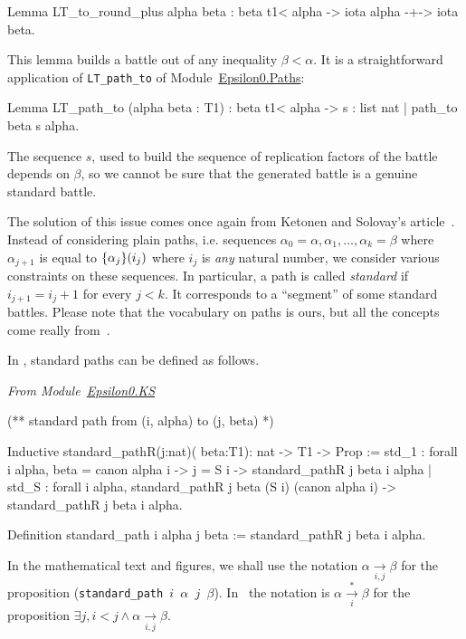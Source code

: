 \begin{Coqsrc}
Lemma LT_to_round_plus alpha beta :
    beta t1< alpha ->  iota alpha -+-> iota beta.
\end{Coqsrc}

This lemma builds a battle out of any inequality $\beta<\alpha$. 
It is a straightforward application of \texttt{LT\_path\_to} of
Module~\href{../theories/html/hydras.Epsilon0.Paths.html}{Epsilon0.Paths}:

\begin{Coqsrc}
Lemma LT_path_to (alpha beta : T1) :
  beta t1< alpha -> {s : list nat | path_to beta s alpha}.
\end{Coqsrc}

The sequence $s$, used to build the sequence of replication factors of the battle depends on 
$\beta$, so we cannot be sure that the generated battle is a genuine standard battle.


The solution of this issue comes  once again from Ketonen and Solovay's article~\cite{KS81}. Instead of considering plain paths, i.e. sequences 
$\alpha_0=\alpha,\alpha_1,\dots,\alpha_k=\beta$ where $\alpha_{j+1}$ is equal
to $\mbox{$\{\alpha_j\}(i_j)$}$ where $i_j$ is \emph{any} natural number, 
we consider various constraints on these sequences.
In particular, a path is called \emph{standard} if $i_{j+1} = i_j + 1$ for every $j<k$.
It  corresponds to a ``segment'' of some standard battles. 
Please note that the vocabulary on paths is ours, but all the concepts come really from~\cite{KS81}.

In \coq{}, standard paths can be defined as follows.

\vspace{4pt}
\emph{From Module~\href{../theories/html/hydras.Epsilon0.KS.html}{Epsilon0.KS}}

\begin{Coqsrc}
(**  standard path from (i, alpha) to (j, beta) *)

Inductive standard_pathR(j:nat)( beta:T1):  nat -> T1 -> Prop :=
  std_1 : forall i alpha, 
       beta = canon alpha i -> j = S i ->
       standard_pathR j beta i  alpha
| std_S : forall i alpha, 
      standard_pathR j beta (S i) (canon alpha i)  ->
      standard_pathR j beta i alpha.

Definition standard_path  i alpha j beta := 
   standard_pathR j beta i alpha.
\end{Coqsrc}

In the mathematical text and figures, we shall use the notation 
$\alpha \xrightarrow[i,j]{}\beta$ for the proposition 
(\texttt{standard\_path $i$ $\alpha$ $j$ $\beta$}).
In~\cite{KS81} the notation is
$\alpha \xrightarrow[i]{*}\beta$
for 
the proposition  $\exists j, i<j \wedge \alpha \xrightarrow[i,j]{} \beta$.



